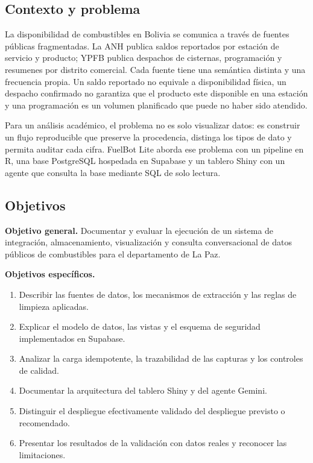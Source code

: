 \documentclass[12pt,a4paper]{article}
\begin{document}
\subsection{Contexto y problema}

La disponibilidad de combustibles en Bolivia se comunica a través de fuentes públicas fragmentadas. La ANH publica saldos reportados por estación de servicio y producto; YPFB publica despachos de cisternas, programación y resumenes por distrito comercial. Cada fuente tiene una semántica distinta y una frecuencia propia. Un saldo reportado no equivale a disponibilidad física, un despacho confirmado no garantiza que el producto este disponible en una estación y una programación es un volumen planificado que puede no haber sido atendido.

Para un análisis académico, el problema no es solo visualizar datos: es construir un flujo reproducible que preserve la procedencia, distinga los tipos de dato y permita auditar cada cifra. FuelBot Lite aborda ese problema con un pipeline en R, una base PostgreSQL hospedada en Supabase y un tablero Shiny con un agente que consulta la base mediante SQL de solo lectura.

\subsection{Objetivos}

\textbf{Objetivo general.} Documentar y evaluar la ejecución de un sistema de integración, almacenamiento, visualización y consulta conversacional de datos públicos de combustibles para el departamento de La Paz.

\textbf{Objetivos específicos.}
\begin{enumerate}[leftmargin=1.2cm]
  \item Describir las fuentes de datos, los mecanismos de extracción y las reglas de limpieza aplicadas.
  \item Explicar el modelo de datos, las vistas y el esquema de seguridad implementados en Supabase.
  \item Analizar la carga idempotente, la trazabilidad de las capturas y los controles de calidad.
  \item Documentar la arquitectura del tablero Shiny y del agente Gemini.
  \item Distinguir el despliegue efectivamente validado del despliegue previsto o recomendado.
  \item Presentar los resultados de la validación con datos reales y reconocer las limitaciones.
\end{enumerate}
\end{document}
